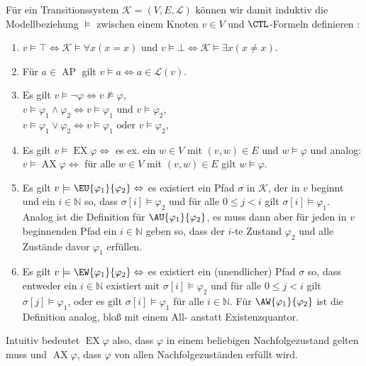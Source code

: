 \begin{definition}
	Für ein Transitionssystem $\mathcal{K}=(V,E,\mathcal{L})$ können wir damit induktiv die Modellbeziehung $\models$ zwischen einem Knoten $v\in V$ und $\CTL$-Formeln definieren \cite{baier2008principles}:
	\begin{enumerate}
		\item $v\models \top \Leftrightarrow \mathcal{K}\models\forall x(x=x)$ und $v\models \bot \Leftrightarrow \mathcal{K}\models\exists x(x\neq x)$.
		\item Für $a\in \operatorname{AP}$ gilt $v\models a \Leftrightarrow a\in \mathcal{L}(v)$.
		\item Es gilt $v\models \neg \varphi \Leftrightarrow v\not\models \varphi$,\\
		$v\models \varphi_1 \land \varphi_2 \Leftrightarrow v\models \varphi_1 \text{ und } v\models \varphi_2$,\\
		$v\models \varphi_1 \lor \varphi_2 \Leftrightarrow v\models \varphi_1 \text{ oder } v\models \varphi_2$,
		\item Es gilt $v\models \operatorname{EX}\varphi \Leftrightarrow$ es ex. ein $w\in V$ mit $(v,w)\in E$ und $w\models \varphi$ und analog:\\ 
		$v\models \operatorname{AX}\varphi \Leftrightarrow$ für alle $w\in V$ mit $(v,w)\in E$ gilt $w\models \varphi$.
		\item Es gilt $v\models \EU{\varphi_1}{\varphi_2} \Leftrightarrow$ es existiert ein Pfad $\sigma$ in $\mathcal{K}$, der in $v$ beginnt und ein $i\in \mathbb{N}$ so, dass $\sigma[i]\models \varphi_2$ und für alle $0\leq j < i$ gilt $\sigma[i]\models \varphi_1$. 
		Analog ist die Definition für $\AU{\varphi_1}{\varphi_2}$, es muss dann aber für jeden in $v$ beginnenden Pfad ein $i\in \mathbb{N}$ geben so, dass der $i$-te Zustand $\varphi_2$ und alle Zustände davor $\varphi_1$ erfüllen.
		\item Es gilt $v\models \EW{\varphi_1}{\varphi_2} \Leftrightarrow$ es existiert ein (unendlicher) Pfad $\sigma$ so, dass entweder ein $i\in \mathbb{N}$ existiert mit $\sigma[i]\models \varphi_2$ und für alle $0\leq j < i$ gilt $\sigma[j]\models \varphi_1$, oder es gilt $\sigma[i]\models \varphi_1$ für alle $i\in \mathbb{N}$.
		Für $\AW{\varphi_1}{\varphi_2}$ ist die Definition analog, bloß mit einem All- anstatt Existenzquantor.
	\end{enumerate}
\end{definition}

Intuitiv bedeutet $\operatorname{EX}\varphi$ also, dass $\varphi$ in einem beliebigen Nachfolgezustand gelten muss und $\operatorname{AX}\varphi$, dass $\varphi$ von allen Nachfolgezuständen erfüllt wird.

